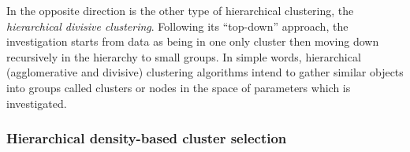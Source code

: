 \documentclass[fleqn,usenatbib]{mnras}
\begin{document}
In the opposite direction is the other type of hierarchical clustering, the \textit{hierarchical divisive clustering}. 
Following its ``top-down'' approach, the investigation starts from data as being in one only cluster then moving down recursively
in the hierarchy to small groups.
In simple words, hierarchical (agglomerative and divisive) clustering 
algorithms intend to 
gather similar objects into groups called clusters or nodes in the space of parameters which is investigated. 





\subsubsection{Hierarchical density-based cluster selection}
\label{sec:hdbscan}
\end{document}
